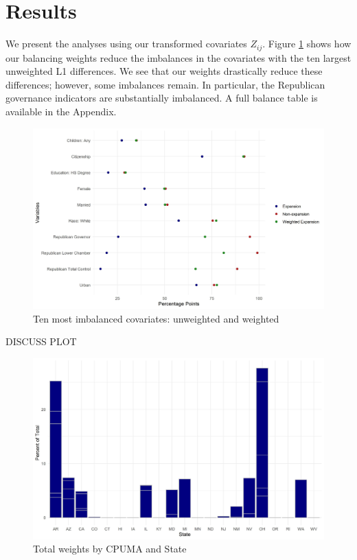 \documentclass[12pt]{article}
\begin{document}
\section{Results}

We present the analyses using our transformed covariates $Z_{ij}$. Figure \ref{loveplot} shows how our balancing weights reduce the imbalances in the covariates with the ten largest unweighted L1 differences. We see that our weights drastically reduce these differences; however, some imbalances remain. In particular, the Republican governance indicators are substantially imbalanced. A full balance table is available in the Appendix. 

\begin{figure}[B]
\begin{center}
    \includegraphics[scale=0.6]{images/balance-plot-largest10-unweighted.jpeg}
    \caption{Ten most imbalanced covariates: unweighted and weighted}
    \label{loveplot}
\end{center}
\end{figure}

DISCUSS PLOT

\begin{figure}[B]
\begin{center}
    \includegraphics[scale=0.6]{images/cpuma-state-wgt-plot-new.jpeg}
    \caption{Total weights by CPUMA and State}
    \label{statewghts}
\end{center}
\end{figure}
\end{document}
